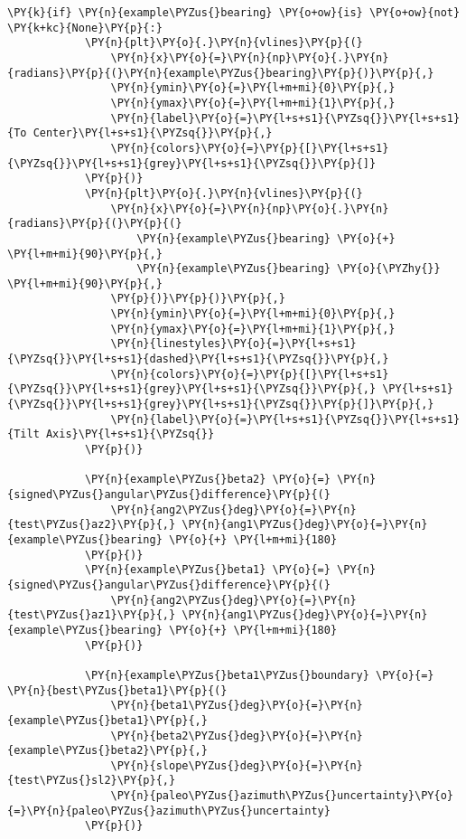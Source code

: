 \begin{tcolorbox}[breakable, size=fbox, boxrule=1pt, pad at break*=1mm,colback=cellbackground, colframe=cellborder]
\begin{Verbatim}[commandchars=\\\{\}]
        \PY{k}{if} \PY{n}{example\PYZus{}bearing} \PY{o+ow}{is} \PY{o+ow}{not} \PY{k+kc}{None}\PY{p}{:}
            \PY{n}{plt}\PY{o}{.}\PY{n}{vlines}\PY{p}{(}
                \PY{n}{x}\PY{o}{=}\PY{n}{np}\PY{o}{.}\PY{n}{radians}\PY{p}{(}\PY{n}{example\PYZus{}bearing}\PY{p}{)}\PY{p}{,}
                \PY{n}{ymin}\PY{o}{=}\PY{l+m+mi}{0}\PY{p}{,}
                \PY{n}{ymax}\PY{o}{=}\PY{l+m+mi}{1}\PY{p}{,}
                \PY{n}{label}\PY{o}{=}\PY{l+s+s1}{\PYZsq{}}\PY{l+s+s1}{To Center}\PY{l+s+s1}{\PYZsq{}}\PY{p}{,}
                \PY{n}{colors}\PY{o}{=}\PY{p}{[}\PY{l+s+s1}{\PYZsq{}}\PY{l+s+s1}{grey}\PY{l+s+s1}{\PYZsq{}}\PY{p}{]}
            \PY{p}{)}
            \PY{n}{plt}\PY{o}{.}\PY{n}{vlines}\PY{p}{(}
                \PY{n}{x}\PY{o}{=}\PY{n}{np}\PY{o}{.}\PY{n}{radians}\PY{p}{(}\PY{p}{(}
                    \PY{n}{example\PYZus{}bearing} \PY{o}{+} \PY{l+m+mi}{90}\PY{p}{,}
                    \PY{n}{example\PYZus{}bearing} \PY{o}{\PYZhy{}} \PY{l+m+mi}{90}\PY{p}{,}
                \PY{p}{)}\PY{p}{)}\PY{p}{,}
                \PY{n}{ymin}\PY{o}{=}\PY{l+m+mi}{0}\PY{p}{,}
                \PY{n}{ymax}\PY{o}{=}\PY{l+m+mi}{1}\PY{p}{,}
                \PY{n}{linestyles}\PY{o}{=}\PY{l+s+s1}{\PYZsq{}}\PY{l+s+s1}{dashed}\PY{l+s+s1}{\PYZsq{}}\PY{p}{,}
                \PY{n}{colors}\PY{o}{=}\PY{p}{[}\PY{l+s+s1}{\PYZsq{}}\PY{l+s+s1}{grey}\PY{l+s+s1}{\PYZsq{}}\PY{p}{,} \PY{l+s+s1}{\PYZsq{}}\PY{l+s+s1}{grey}\PY{l+s+s1}{\PYZsq{}}\PY{p}{]}\PY{p}{,}
                \PY{n}{label}\PY{o}{=}\PY{l+s+s1}{\PYZsq{}}\PY{l+s+s1}{Tilt Axis}\PY{l+s+s1}{\PYZsq{}}
            \PY{p}{)}
    
            \PY{n}{example\PYZus{}beta2} \PY{o}{=} \PY{n}{signed\PYZus{}angular\PYZus{}difference}\PY{p}{(}
                \PY{n}{ang2\PYZus{}deg}\PY{o}{=}\PY{n}{test\PYZus{}az2}\PY{p}{,} \PY{n}{ang1\PYZus{}deg}\PY{o}{=}\PY{n}{example\PYZus{}bearing} \PY{o}{+} \PY{l+m+mi}{180}
            \PY{p}{)}
            \PY{n}{example\PYZus{}beta1} \PY{o}{=} \PY{n}{signed\PYZus{}angular\PYZus{}difference}\PY{p}{(}
                \PY{n}{ang2\PYZus{}deg}\PY{o}{=}\PY{n}{test\PYZus{}az1}\PY{p}{,} \PY{n}{ang1\PYZus{}deg}\PY{o}{=}\PY{n}{example\PYZus{}bearing} \PY{o}{+} \PY{l+m+mi}{180}
            \PY{p}{)}
    
            \PY{n}{example\PYZus{}beta1\PYZus{}boundary} \PY{o}{=} \PY{n}{best\PYZus{}beta1}\PY{p}{(}
                \PY{n}{beta1\PYZus{}deg}\PY{o}{=}\PY{n}{example\PYZus{}beta1}\PY{p}{,}
                \PY{n}{beta2\PYZus{}deg}\PY{o}{=}\PY{n}{example\PYZus{}beta2}\PY{p}{,}
                \PY{n}{slope\PYZus{}deg}\PY{o}{=}\PY{n}{test\PYZus{}sl2}\PY{p}{,}
                \PY{n}{paleo\PYZus{}azimuth\PYZus{}uncertainty}\PY{o}{=}\PY{n}{paleo\PYZus{}azimuth\PYZus{}uncertainty}
            \PY{p}{)}
    

\end{Verbatim}
\end{tcolorbox}
